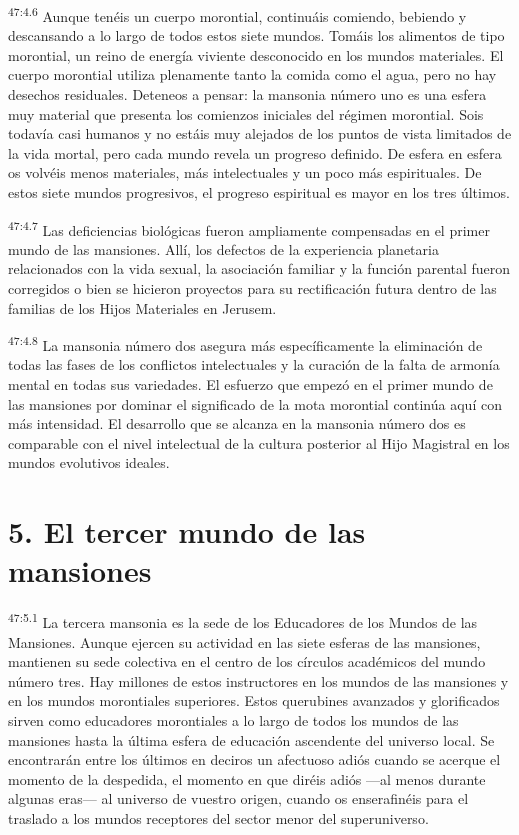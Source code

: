 \par
\textsuperscript{47:4.6} Aunque tenéis un cuerpo morontial, continuáis comiendo, bebiendo y descansando a lo largo de todos estos siete mundos. Tomáis los alimentos de tipo morontial, un reino de energía viviente desconocido en los mundos materiales. El cuerpo morontial utiliza plenamente tanto la comida como el agua, pero no hay desechos residuales. Deteneos a pensar: la mansonia número uno es una esfera muy material que presenta los comienzos iniciales del régimen morontial. Sois todavía casi humanos y no estáis muy alejados de los puntos de vista limitados de la vida mortal, pero cada mundo revela un progreso definido. De esfera en esfera os volvéis menos materiales, más intelectuales y un poco más espirituales. De estos siete mundos progresivos, el progreso espiritual es mayor en los tres últimos.

\par
\textsuperscript{47:4.7} Las deficiencias biológicas fueron ampliamente compensadas en el primer mundo de las mansiones. Allí, los defectos de la experiencia planetaria relacionados con la vida sexual, la asociación familiar y la función parental fueron corregidos o bien se hicieron proyectos para su rectificación futura dentro de las familias de los Hijos Materiales en Jerusem.

\par
\textsuperscript{47:4.8} La mansonia número dos asegura más específicamente la eliminación de todas las fases de los conflictos intelectuales y la curación de la falta de armonía mental en todas sus variedades. El esfuerzo que empezó en el primer mundo de las mansiones por dominar el significado de la mota morontial continúa aquí con más intensidad. El desarrollo que se alcanza en la mansonia número dos es comparable con el nivel intelectual de la cultura posterior al Hijo Magistral en los mundos evolutivos ideales.

\section*{5. El tercer mundo de las mansiones}
\par
\textsuperscript{47:5.1} La tercera mansonia es la sede de los Educadores de los Mundos de las Mansiones. Aunque ejercen su actividad en las siete esferas de las mansiones, mantienen su sede colectiva en el centro de los círculos académicos del mundo número tres. Hay millones de estos instructores en los mundos de las mansiones y en los mundos morontiales superiores. Estos querubines avanzados y glorificados sirven como educadores morontiales a lo largo de todos los mundos de las mansiones hasta la última esfera de educación ascendente del universo local. Se encontrarán entre los últimos en deciros un afectuoso adiós cuando se acerque el momento de la despedida, el momento en que diréis adiós ---al menos durante algunas eras--- al universo de vuestro origen, cuando os enserafinéis para el traslado a los mundos receptores del sector menor del superuniverso.

